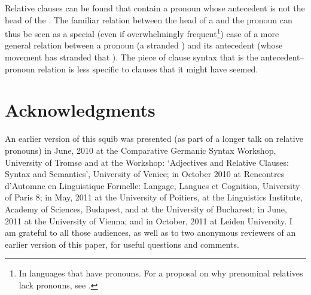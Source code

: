 \documentclass[output=paper]{LSP/langsci}
\begin{document}
     Relative clauses can be found that contain a  pronoun whose antecedent is not the head of the .  The familiar relation between the head of a  and the  pronoun can thus be seen as a special (even if overwhelmingly frequent\footnote{In languages that have  pronouns.  For a proposal on why prenominal relatives lack  pronouns, see \citet[chap. 9]{Kayne1994}.}) case of a more general relation between a  pronoun (a stranded ) and its antecedent (whose movement has stranded that ).  The piece of  clause syntax that is the antecedent-- pronoun relation is less specific to  clauses that it might have seemed.

\section*{Acknowledgments}
An earlier version of this squib was presented (as part of a longer talk on {relative} pronouns) in June, 2010 at the Comparative Germanic Syntax Workshop, University of Tromsø and at the Workshop: `Adjectives and Relative Clauses: Syntax and Semantics', University of Venice; in October 2010 at Rencontres d'Automne en Linguistique Formelle: Langage, Langues et Cognition, University of Paris 8; in May, 2011 at the University of Poitiers, at the Linguistics Institute, Academy of Sciences, Budapest, and at the University of Bucharest; in June, 2011 at the University of Vienna; and in October, 2011 at Leiden University.  I am grateful to all those audiences, as well as to two anonymous reviewers of an earlier version of this paper, for useful questions and comments.

{\sloppy
\printbibliography[heading=subbibliography,notkeyword=this]
}
\end{document}
